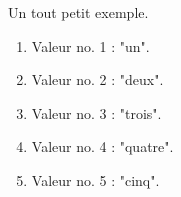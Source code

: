 \documentclass{article}
\begin{document}
Un tout petit exemple.

\begin{enumerate}
    \item Valeur no. 1 : "un".
    \item Valeur no. 2 : "deux".
    \item Valeur no. 3 : "trois".
    \item Valeur no. 4 : "quatre".
    \item Valeur no. 5 : "cinq".
\end{enumerate}
\end{document}
